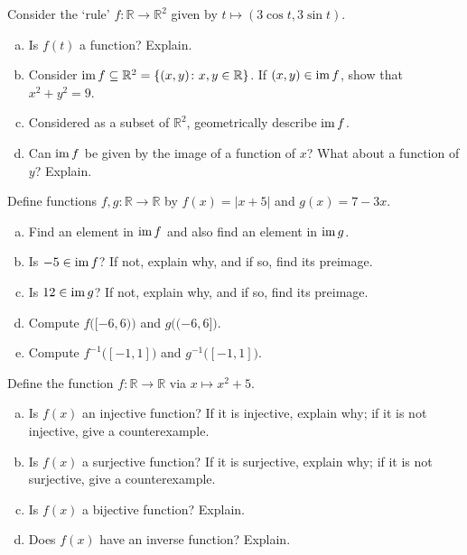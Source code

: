 \documentclass[12pt,letterpaper]{exam}
\begin{document}
\examtitle
{} 
\scores
\bottomline
\newpage

\begin{questions}

\newpage
\question[10] Consider the `rule' $f: \mathbb{R} \to \mathbb{R}^2$ given by $t \mapsto (3\cos t, 3\sin t)$.
	\begin{enumerate}[(a)]
	\item Is $f(t)$ a function? Explain.
	\item Consider $\operatorname{im} f \subseteq \mathbb{R}^2= \{ (x, y) \colon x, y \in \mathbb{R} \}$. If $(x, y) \in \operatorname{im} f$, show that $x^2 + y^2= 9$. 
	\item Considered as a subset of $\mathbb{R}^2$, geometrically describe $\operatorname{im} f$. 
	\item Can $\operatorname{im} f$ be given by the image of a function of $x$? What about a function of $y$? Explain. 
	\end{enumerate}



\newpage
\question[10] Define functions $f, g: \mathbb{R} \to \mathbb{R}$ by $f(x)= |x + 5|$ and $g(x)= 7 - 3x$.
	\begin{enumerate}[(a)]
	\item Find an element in $\operatorname{im} f$ and also find an element in $\operatorname{im} g$. 
	\item Is $-5 \in \operatorname{im} f$? If not, explain why, and if so, find its preimage. 
	\item Is $12 \in \operatorname{im} g$? If not, explain why, and if so, find its preimage. 
	\item Compute $f\big( [-6, 6) \big)$ and $g\big( (-6, 6] \big)$. 
	\item Compute $f^{-1} \big( [-1,1] \big)$ and $g^{-1} \big( [-1, 1] \big)$.
	\end{enumerate}



\newpage
\question[10] Define the function $f: \mathbb{R} \to \mathbb{R}$ via $x \mapsto x^2 + 5$. 
	\begin{enumerate}[(a)]
	\item Is $f(x)$ an injective function? If it is injective, explain why; if it is not injective, give a counterexample. 
	\item Is $f(x)$ a surjective function? If it is surjective, explain why; if it is not surjective, give a counterexample. 
	\item Is $f(x)$ a bijective function? Explain. 
	\item Does $f(x)$ have an inverse function? Explain. 
	\end{enumerate}




\end{questions}
\end{document}

